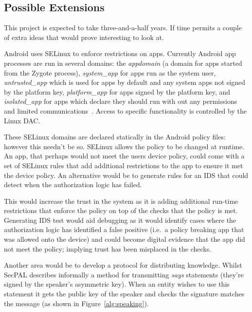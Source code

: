 \documentclass[a4paper]{article}
\begin{document}
\subsection{Possible Extensions}

This project is expected to take three-and-a-half years.  If time permits a
couple of extra ideas that would prove interesting to look at.

Android uses SELinux to enforce restrictions on apps.  Currently Android app
processes are run in several domains: the \emph{appdomain} (a domain for apps
started from the Zygote process), \emph{system\_app} for apps run as the system
user, \emph{untrusted\_app} which is used for apps by default and any system
apps not signed by the platform key, \emph{platform\_app} for apps signed by the
platform key, and \emph{isolated\_app} for apps which declare they should run
with out any permissions and limited communications~\cite{google:sepolicy}.
Access to specific functionality is controlled by the Linux \ac{DAC}.

These SELinux domains are declared statically in the Android policy files:
however this needn't be so.  SELinux allows the policy to be changed at runtime.
An app, that perhaps would not meet the users device policy, could come with a
set of SELinux rules that add additional restrictions to the app to ensure it
met the device policy.  An alternative would be to generate rules for an
\ac{IDS} that could detect when the authorization logic has failed.

This would increase the trust in the system as it is adding additional run-time
restrictions that enforce the policy on top of the checks that the policy is
met.  Generating \ac{IDS} test would aid debugging as it would identify cases
where the authorization logic has identified a false positive (i.e.~a policy
breaking app that was allowed onto the device) and could become digital evidence
that the app did not meet the policy; implying trust has been misplaced in the
checks.

Another area would be to develop a protocol for distributing knowledge.  
Whilst SecPAL describes informally a method for transmitting \emph{says}
statements (they're signed by the speaker's asymmetric key).  When an entity
wishes to use this statement it gets the public key of the speaker and checks
the signature matches the message (as shown in Figure~\ref{alg:speaking}).  
\end{document}
